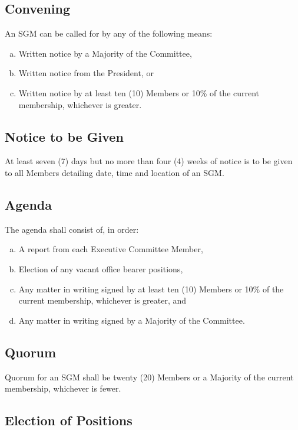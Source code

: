 \documentclass[a4paper,12pt]{article}
\begin{document}
\subsection{Convening}

An SGM can be called for by any of the following means:

\begin{enumerate}[a)]
	\item Written notice by a Majority of the Committee,
	\item Written notice from the President, or
	\item Written notice by at least ten (10) Members or 10\% of the current membership, whichever is greater.
\end{enumerate}

\subsection{Notice to be Given}

At least seven (7) days but no more than four (4) weeks of notice is to be given to all Members detailing date, time and location of an SGM.

\subsection{Agenda}

The agenda shall consist of, in order:

\begin{enumerate}[a)]
	\item A report from each Executive Committee Member,
	\item Election of any vacant office bearer positions,
	\item Any matter in writing signed by at least ten (10) Members or 10\% of the current membership, whichever is greater, and
	\item Any matter in writing signed by a Majority of the Committee.
\end{enumerate}

\subsection{Quorum}

Quorum for an SGM shall be twenty (20) Members or a Majority of the current membership, whichever is fewer.

\subsection{Election of Positions}
\end{document}
